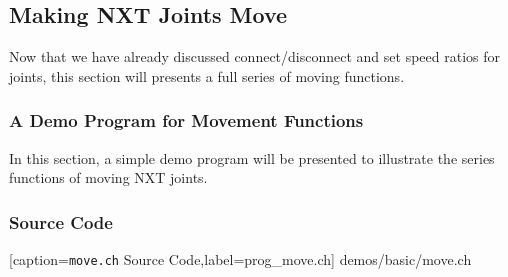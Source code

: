 \documentclass[11pt]{article}
\begin{document}
\subsection{\label{sec:move_demo}Making NXT Joints Move}
Now that we have already discussed connect/disconnect and set speed ratios for joints, this section will presents a full
series of moving functions.

\subsubsection{A Demo Program for Movement Functions}
In this section, a simple demo program will be presented to illustrate the series functions of moving NXT joints.

\subsubsection*{Source Code}

    [caption={{\tt move.ch} Source Code},label=prog_move.ch]
    {demos/basic/move.ch}
\end{document}
